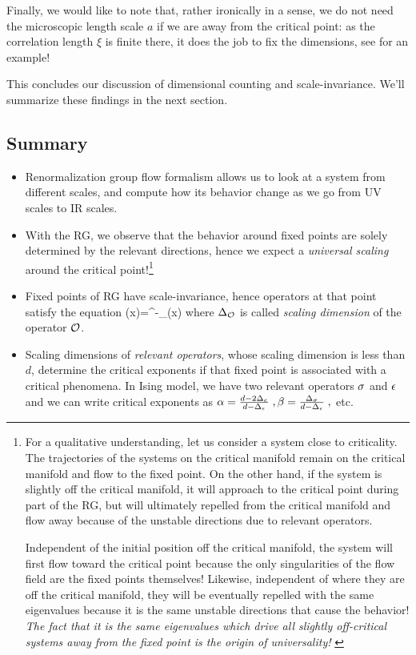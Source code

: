 {	Finally, we would like to note that, rather ironically in a sense, we do not need the microscopic length scale $a$ if we are away from the critical point: as the correlation length $\xi$ is finite there, it does the job to fix the dimensions, see  for an example!
}


This concludes our discussion of dimensional counting and scale-invariance. We'll summarize these findings in the next section.

\subsection{Summary}

\begin{itemize}
	
	\item Renormalization group flow formalism allows us to look at a system from different scales, and compute how its behavior change as we go from UV scales to IR scales. 
	
	\item With the RG, we observe that the behavior around fixed points are solely determined by the relevant directions, hence we expect a \emph{universal scaling} around the critical point!\footnote{For a qualitative understanding, let us consider a system close to criticality. The trajectories of the systems on the critical manifold remain on the critical manifold and flow to the fixed point. On the other hand, if the system is slightly off the critical manifold, it will approach to the critical point during part of the RG, but will ultimately repelled from the critical manifold and flow away because of the unstable directions due to relevant operators.
		
		Independent of the initial position off the critical manifold, the system will first flow toward the critical point because the only singularities of the flow field are the fixed points themselves! Likewise, independent of where they are off the critical manifold, they will be eventually repelled with the same eigenvalues because it is the same unstable directions that cause the behavior! \emph{The fact that it is the same eigenvalues which drive all slightly off-critical systems away from the fixed point is the origin of  universality!} \cite{Goldenfeld:1992qy}}
	
	\item Fixed points of RG have scale-invariance, hence operators at that point satisfy the equation
	\be
	\cO(\lambda x)=\lambda^{-\De_{\cO}}\cO(x) 
	\ee
	where $\Delta_{\mathcal{O}}$ is called \emph{scaling dimension} of the operator $\mathcal{O}$.
	\item Scaling dimensions of \emph{relevant operators}, whose scaling dimension is less than $d$, determine the critical exponents if that fixed point is associated with a critical phenomena. In Ising model, we have two relevant operators $\sigma$ and $\epsilon$ and we can write critical exponents as $\alpha=\frac{d-2\Delta_e}{d-\Delta_\epsilon}\;,
	\beta=\frac{\Delta_\sigma}{d-\Delta_\epsilon}\;,$ etc.
	

\end{itemize}
